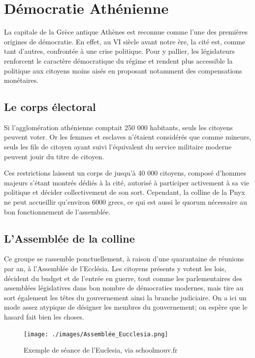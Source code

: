 \documentclass[11pt,a4paper]{report}
\begin{document}
\section{Démocratie Athénienne}
La capitale de la Grèce antique Athènes est reconnue comme l'une des premières origines de démocratie. 
En effet, au VI siècle avant notre ère, la cité est, comme tant d'autres, confrontée à une crise politique. 
Pour y pallier, les législateurs renforcent le caractère démocratique du régime et rendent plus accessible la politique aux citoyens moins aisés en proposant notamment des compensations monétaires.

\subsection{Le corps électoral}
Si l'agglomération athénienne comptait 250 000 habitants\nocite{persee:popu}, seuls les citoyens peuvent voter. 
Or les femmes et esclaves n'étaient considérés que comme mineurs, seuls les fils de citoyen ayant suivi l'équivalent du service militaire moderne peuvent jouir du titre de citoyen.

Ces restrictions laissent un corps de jusqu'à 40 000 citoyens, composé d'hommes majeurs s'étant montrés dédiés à la cité, autorisé à participer activement à sa vie politique et décider collectivement de son sort. 
Cependant, la colline de la Pnyx ne peut accueillir qu'environ 6000 grecs, ce qui est aussi le quorum nécessaire au bon fonctionnement de l'assemblée. \nocite{wiki:pnyx}

\subsection{L'Assemblée de la colline}
Ce groupe se rassemble ponctuellement, à raison d'une quarantaine de réunions par an, à l'Assemblée de l'Ecclésia. \nocite{wiki:ecclesia}
Les citoyens présents y votent les lois, décident du budget et de l'entrée en guerre, tout comme les parlementaires des assemblées législatives dans bon nombre de démocraties modernes, mais tire au sort également les têtes du gouvernement ainsi la branche judiciaire. \nocite{wiki:heliastes}
On a ici un mode assez atypique de désigner les membres du gouvernement; on espère que le hasard fait bien les choses.

\begin{figure}[h]
	\centering
	\texttt{[image: ./images/Assemblée\_Eucclesia.png]}
	\caption{Exemple de séance de l'Euclesia, via schoolmouv.fr \cite{schoolmouv:Euclesia}}
	\label{Euclesia:assemble}
\end{figure}
\end{document}
